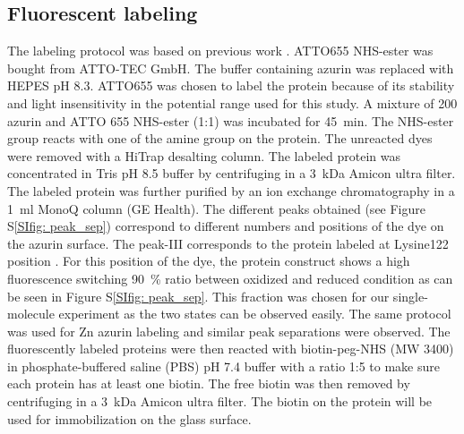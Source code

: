 \documentclass[journal=jacsat,manuscript=article]{achemso}
\begin{document}
\subsection{Fluorescent labeling}
The labeling protocol was based on previous work \cite{nicolardi2012topdown}.
ATTO655 NHS-ester was bought from ATTO-TEC GmbH.
The buffer containing azurin was replaced with HEPES pH 8.3.
ATTO655 was chosen to label the protein because of its stability and light insensitivity in the potential range used for this study.
A mixture of \SI{200}{\uM} azurin and ATTO 655 NHS-ester (1:1) was incubated for \SI{45}{\minute}.
The NHS-ester group reacts with one of the amine group on the protein.
The unreacted dyes were removed with a HiTrap desalting column.
The labeled protein was concentrated in Tris pH 8.5 buffer by centrifuging in a \SI{3}{ kDa} Amicon ultra filter.
The labeled protein was further purified by an ion exchange chromatography in a \SI{1}{\ml} MonoQ column (GE Health).
The different peaks obtained (see Figure S\ref{SIfig: peak_sep}) correspond to different numbers and positions of the dye on the azurin surface. 
The peak-III corresponds to the protein labeled at Lysine122 position \cite{nicolardi2012topdown}.
For this position of the dye, the protein construct shows a high fluorescence switching \SI{90}{\percent} ratio between oxidized and reduced condition as can be seen in Figure S\ref{SIfig: peak_sep}. This fraction was chosen for our single-molecule experiment as the two states can be observed easily.
The same protocol was used for Zn azurin labeling and similar peak separations were observed.
The fluorescently labeled proteins were then reacted with biotin-peg-NHS (MW 3400) in phosphate-buffered saline (PBS) pH 7.4 buffer with a ratio 1:5 to make sure each protein has at least one biotin.
The free biotin was then removed by centrifuging in a \SI{3}{ kDa} Amicon ultra filter.
The biotin on the protein will be used for immobilization on the glass surface.
\end{document}
